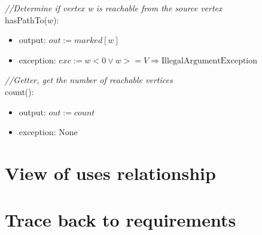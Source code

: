\documentclass[12pt]{article}
\begin{document}
\noindent \textit{//Determine if vertex w is reachable from the source vertex}\\
\noindent hasPathTo($w$):
\begin{itemize}
\item output: $out := marked[w]$
\item exception: $exc := w < 0 \lor w >= V \Rightarrow \mbox{IllegalArgumentException}$
\end{itemize}

\noindent \textit{//Getter, get the number of reachable vertices}\\
\noindent count():
\begin{itemize}
\item output: $out := count$
\item exception: None
\end{itemize}
\newpage

\section{View of uses relationship}
\section{Trace back to requirements}
\end{document}

